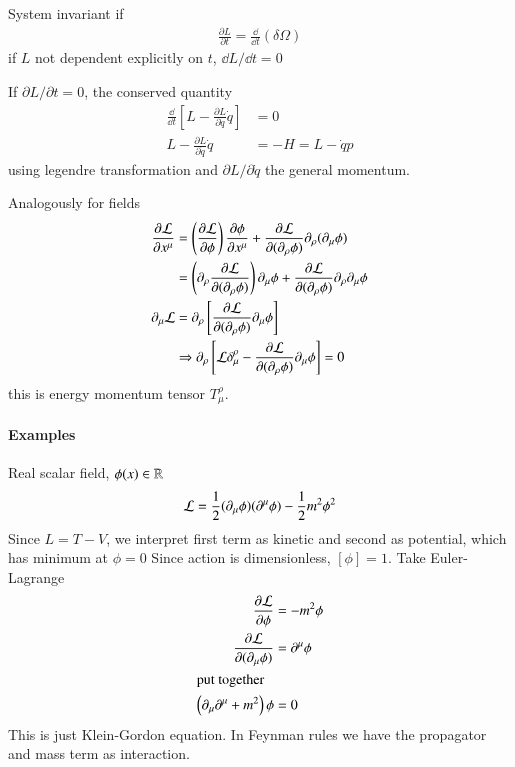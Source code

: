 System invariant if
\begin{align}
   \frac{\partial L}{\partial t} = \frac{\dd}{\dd{t} } (\delta \Omega)
\end{align}
if $L$ not dependent explicitly on $t$, $\dd{L} / \dd{t} = 0$

If $\partial L / \partial t = 0$, the conserved quantity
\begin{align*}
   \frac{\dd}{\dd{t}} \left[ L - \frac{\partial L}{\partial \dot{q}} \dot{q} \right] &= 0 \\
   L - \frac{\partial L}{\partial \dot{q}} \dot{q} &= -H = L - \dot{q} p
\end{align*}
using legendre transformation and $\partial L / \partial \dot{q}$ the general momentum.

Analogously for fields
\begin{align*}
   \frac{\partial \mathcal{L}}{\partial x^\mu} &= \left(\frac{\partial \mathcal{L}}{\partial \phi} \right) \frac{\partial \phi}{\partial x^\mu} + \frac{\partial \mathcal{L}}{ \partial (\partial_\rho \phi)} \partial_\rho (\partial_\mu \phi) \\
                                        &= \left(\partial_\rho \frac{\partial \mathcal{L}}{\partial(\partial_\rho \phi)} \right) \partial_\mu \phi + \frac{\partial \mathcal{L}}{ \partial (\partial_\rho \phi)} \partial_\rho \partial_\mu \phi \\
                     \partial_\mu \mathcal{L} &= \partial_\rho \left[ \frac{\partial \mathcal{L}}{\partial(\partial_\rho \phi)} \partial_\mu \phi \right]  \\
                                       &\Rightarrow \partial_\rho \left[ \mathcal{L} \delta_{\mu}^{\rho} - \frac{\partial \mathcal{L}}{\partial (\partial_\rho \phi)} \partial_\mu \phi \right] = 0
\end{align*}
this is energy momentum tensor $T_{\mu}^{\rho}$.

\paragraph{Examples}
Real scalar field, $\phi(x) \in \mathbb{R}$
\begin{align}
   \mathcal{L} = \frac{1}{2} (\partial_\mu \phi) (\partial^\mu \phi) - \frac{1}{2} m^2 \phi^2
\end{align}
Since $L = T - V$, we interpret first term as kinetic and second as potential, which has minimum at $\phi=0$
Since action is dimensionless, $[\phi] = 1$. Take Euler-Lagrange 
\begin{align*}
   \frac{\partial \mathcal{L}}{\partial \phi} &= - m^2 \phi \\
   \frac{\partial \mathcal{L}}{\partial (\partial_\mu \phi)} &= \partial^\mu \phi \\
   \shortintertext{put together}
   \left( \partial_\mu \partial^\mu + m^2 \right)\phi &= 0
\end{align*}
This is just Klein-Gordon equation. In Feynman rules we have the propagator and mass term as interaction.

